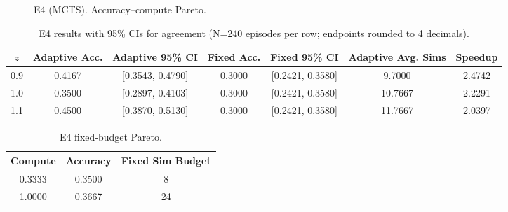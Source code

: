 \begin{figure}[H]
  \centering
  \begin{adjustbox}{width=\linewidth}
  \end{adjustbox}
  \caption{E4 (MCTS). Accuracy--compute Pareto.}
  \label{fig:e4b}
\end{figure}

\begin{table}[H]
  \centering
  \caption{E4 results with 95\% CIs for agreement (N=240 episodes per row; endpoints rounded to 4 decimals).}
  \vspace{0.25em}
  \begin{adjustbox}{width=\linewidth}
  \begin{tabular}{c c c c c c c}
    \toprule
    $z$ & Adaptive Acc. & Adaptive 95\% CI & Fixed Acc. & Fixed 95\% CI & Adaptive Avg. Sims & Speedup \\
    \midrule
    0.9 & 0.4167 & [0.3543, 0.4790] & 0.3000 & [0.2421, 0.3580] & 9.7000 & 2.4742 \\
    1.0 & 0.3500 & [0.2897, 0.4103] & 0.3000 & [0.2421, 0.3580] & 10.7667 & 2.2291 \\
    1.1 & 0.4500 & [0.3870, 0.5130] & 0.3000 & [0.2421, 0.3580] & 11.7667 & 2.0397 \\
    \bottomrule
  \end{tabular}
  \end{adjustbox}
\end{table}

\begin{table}[H]
  \centering
  \caption{E4 fixed-budget Pareto.}
  \vspace{0.25em}
  \begin{adjustbox}{width=\linewidth}
  \begin{tabular}{c c c}
    \toprule
    Compute & Accuracy & Fixed Sim Budget \\
    \midrule
    0.3333 & 0.3500 & 8 \\
    1.0000 & 0.3667 & 24 \\
    \bottomrule
  \end{tabular}
  \end{adjustbox}
\end{table}

